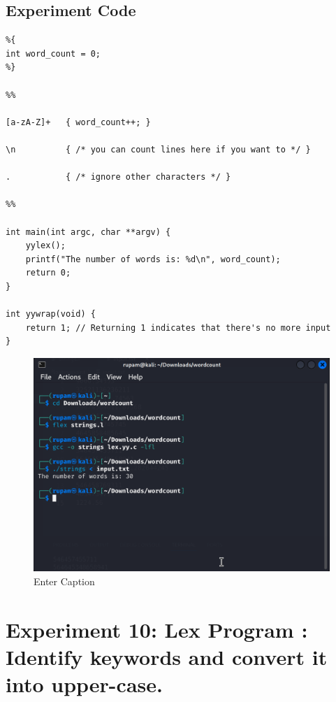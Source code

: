 \documentclass[12pt]{article}
\begin{document}
\subsection*{Experiment Code}
\begin{lstlisting}
%{
int word_count = 0;
%}

%%

[a-zA-Z]+   { word_count++; }

\n          { /* you can count lines here if you want to */ }

.           { /* ignore other characters */ }

%%

int main(int argc, char **argv) {
    yylex();
    printf("The number of words is: %d\n", word_count);
    return 0;
}

int yywrap(void) {
    return 1; // Returning 1 indicates that there's no more input
}
\end{lstlisting}
\begin{figure}[H]
    \centering
    \includegraphics[width=1\linewidth]{exp9output.png}
    \caption{Enter Caption}
\end{figure}

\newpage
\section*{Experiment 10: Lex Program : Identify keywords and convert it into upper-case.}
\end{document}
